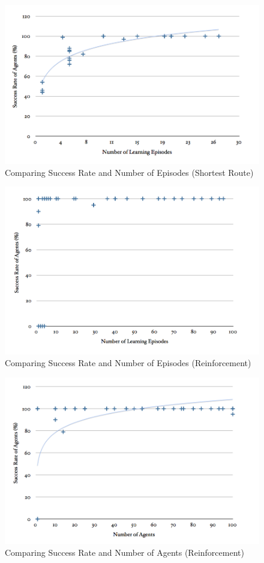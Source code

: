 \documentclass[a4paper,oneside]{report}
\begin{document}
\begin{figure}[H]
  \centering
    \includegraphics[width=130mm]{sources/images/SE_SR}
    \caption{Comparing Success Rate and Number of Episodes (Shortest Route)}
    \label{fig:SE_SR}
\end{figure}

\begin{figure}[H]
  \centering
    \includegraphics[width=130mm]{sources/images/SE_RL}
    \caption{Comparing Success Rate and Number of Episodes (Reinforcement)}
    \label{fig:SE_RL}
\end{figure}

\begin{figure}[H]
  \centering
    \includegraphics[width=130mm]{sources/images/SA_RL}
    \caption{Comparing Success Rate and Number of Agents (Reinforcement)}
    \label{fig:SA_RL}
\end{figure}
\end{document}
